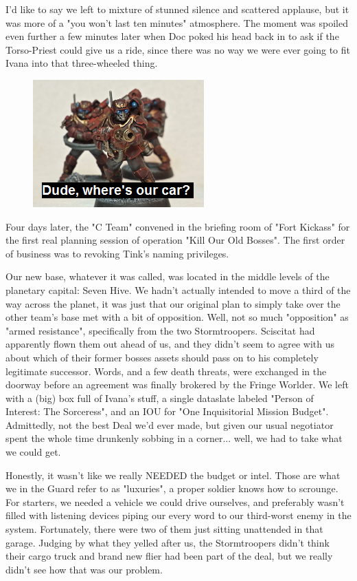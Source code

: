 I'd like to say we left to mixture of stunned silence and scattered applause, but it was more of a "you won't last ten minutes" atmosphere. 
The moment was spoiled even further a few minutes later when Doc poked his head back in to ask if the Torso-Priest could give us a ride, since there was no way we were ever going to fit Ivana into that three-wheeled thing.

\begin{figure}
	\begin{center}
		\includegraphics[width=\figwidth]{pics/19/17.png}
	\end{center}
\end{figure}
Four days later, the "C Team" convened in the briefing room of "Fort Kickass" for the first real planning session of operation "Kill Our Old Bosses". 
The first order of business was to revoking Tink's naming privileges.

Our new base, whatever it was called, was located in the middle levels of the planetary capital: 
Seven Hive. 
We hadn't actually intended to move a third of the way across the planet, it was just that our original plan to simply take over the other team's base met with a bit of opposition. 
Well, not so much "opposition" as "armed resistance", specifically from the two Stormtroopers. 
Sciscitat had apparently flown them out ahead of us, and they didn't seem to agree with us about which of their former bosses assets should pass on to his completely legitimate successor. 
Words, and a few death threats, were exchanged in the doorway before an agreement was finally brokered by the Fringe Worlder. 
We left with a (big) box full of Ivana's stuff, a single dataslate labeled "Person of Interest: 
The Sorceress", and an IOU for "One Inquisitorial Mission Budget". 
Admittedly, not the best Deal we'd ever made, but given our usual negotiator spent the whole time drunkenly sobbing in a corner... 
well, we had to take what we could get.

Honestly, it wasn't like we really NEEDED the budget or intel. 
Those are what we in the Guard refer to as "luxuries", a proper soldier knows how to scrounge. 
For starters, we needed a vehicle we could drive ourselves, and preferably wasn't filled with listening devices piping our every word to our third-worst enemy in the system. 
Fortunately, there were two of them just sitting unattended in that garage. 
Judging by what they yelled after us, the Stormtroopers didn't think their cargo truck and brand new flier had been part of the deal, but we really didn't see how that was our problem.

